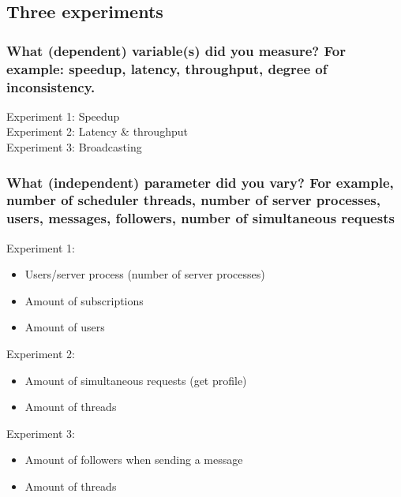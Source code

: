 \documentclass[a4paper]{article}
\begin{document}
\subsection{Three experiments}
\subsubsection{What (dependent) variable(s) did you measure? For example: speedup, latency, 
		throughput, degree of inconsistency.}
		Experiment 1: Speedup \\
		Experiment 2: Latency \& throughput \\
		Experiment 3: Broadcasting \\
\subsubsection{What (independent) parameter did you vary? For example, number of scheduler threads,
number of server processes, users, messages, followers, number of simultaneous requests }
		Experiment 1:		
		\begin{itemize}
			\item Users/server process (number of server processes)
			\item  Amount of subscriptions 
			\item  Amount of users
		\end{itemize}
		Experiment 2:
		\begin{itemize}
			\item Amount of simultaneous requests (get profile)
			\item Amount of threads 
		\end{itemize}
		Experiment 3:
		\begin{itemize}
			\item Amount of followers when sending a message
			\item Amount of threads
		\end{itemize}
\end{document}
